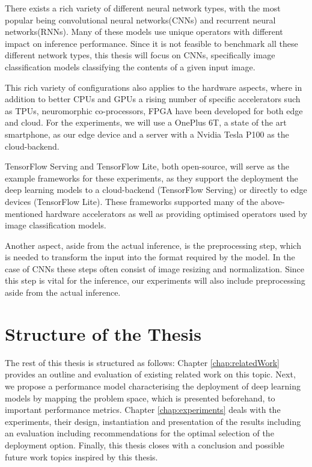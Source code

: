There exists a rich variety of different neural network types, with the most popular being convolutional neural networks(CNNs) and recurrent neural networks(RNNs).
Many of these models use unique operators with different impact on inference performance.
Since it is not feasible to benchmark all these different network types, this thesis will focus on CNNs, specifically image classification models classifying the contents of a given input image.




This rich variety of configurations also applies to the hardware aspects, where in addition to better CPUs and GPUs a rising number of specific accelerators such as TPUs, neuromorphic co-processors, FPGA have been developed for both edge and cloud.
For the experiments, we will use a OnePlus 6T, a state of the art smartphone, as our edge device and a server with a Nvidia Tesla P100 as the cloud-backend.


TensorFlow Serving and TensorFlow Lite, both open-source, will serve as the example frameworks for these experiments, as they support the deployment the deep learning models to a cloud-backend (TensorFlow Serving) or directly to edge devices (TensorFlow Lite). These frameworks supported many of the above-mentioned hardware accelerators as well as providing optimised operators used by image classification models.

Another aspect, aside from the actual inference, is the preprocessing step, which is needed to transform the input into the format required by the model. 
In the case of CNNs these steps often consist of image resizing and normalization.
Since this step is vital for the inference, our experiments will also include preprocessing aside from the actual inference.

\section{Structure of the Thesis}
The rest of this thesis is structured as follows: Chapter \ref{chap:relatedWork} provides an outline and evaluation of existing related work on this topic. Next, we propose a performance model characterising the deployment of deep learning models by mapping the problem space, which is presented beforehand, to important performance metrics.
Chapter \ref{chap:experiments} deals with the experiments, their design, instantiation and presentation of the results including an evaluation including recommendations for the optimal selection of the deployment option.
Finally, this thesis closes with a conclusion and possible future work topics inspired by this thesis.
